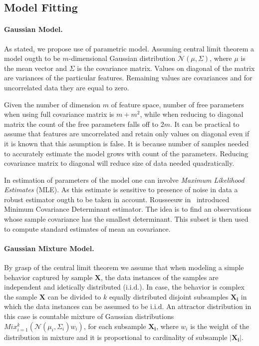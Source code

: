 \subsection{Model Fitting}

\paragraph*{Gaussian Model.}
As stated, we propose use of parametric model. Assuming central limit theorem a model ougth to be
$m$-dimensional Gaussian distribution $\mathcal{N}\left(\mu,\Sigma\right)$, where $\mu$ is the mean vector
and $\Sigma$ is the covariance matrix.  
Values on diagonal of the matrix are variances of the particular features. 
Remaining values are covariances and for uncorrelated data they are equal to zero. 
 
Given the number of dimension $m$ of feature space,
number of free parameters when using full covariance matrix is $m+m^2$, while when reducing 
to diagonal matrix the count of the free parameters falls off to $2m$. 
It can be practical to assume that features are uncorrelated and retain only values on diagonal 
even if it is known that this asumption is false. It is because number of samples needed to accurately
estimate the model grows with count of the parameters. Reducing covariance matrix to diagonal 
will reduce size of data needed quadratically.

In estimation of parameters of the model one can involve \emph{Maximum Likelihood Estimates} (MLE).
As this estimate is sensitive to presence of noise in data a robust estimator ougth to be taken in account.
Rousseeuw in~\cite{rousseeuw1984least} introduced Minimum Covariance Determinant estimator. The 
idea is to find an observations whose sample covariance has the smallest determinant. This subset is
then used to compute standard estimates of mean an covariance.

\paragraph*{Gaussian Mixture Model.}
By grasp of the central limit theorem we assume that when modeling a simple behavior captured by sample 
$\mathbf{X}$, the data instances of the samples are independent and idetically distributed (i.i.d.).
In case, the behavior is complex the sample $\mathbf{X}$ can be divided to $k$ equally distributed 
disjoint subsamples $\mathbf{X_i}$ in which the data instances can be assumed to be i.i.d.  
An attractor distribution in this case is countable mixture of Gaussian distributions
$Mix_{i=1}^k\left(\mathcal{N}\left(\mu_i,\Sigma_i\right)w_i\right)$, for each subsample $\mathbf{X_i}$, 
where $w_i$ is the weight of the distribution in mixture and it is proportional to cardinality of subsample
$\left| \mathbf{X_i} \right|$.

